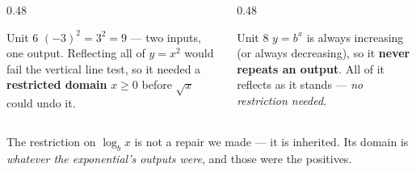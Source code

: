 \documentclass[aspectratio=169, 11pt]{beamer}
\begin{document}
\begin{frame}[t, plain]
  \begin{columns}[T]
    \begin{column}{0.48\textwidth}
      \begin{block}{Unit 6}
        $(-3)^2=3^2=9$ --- two inputs, one output. Reflecting all of $y=x^2$ would fail the vertical
        line test, so it needed a \textbf{restricted domain} $x\ge0$ before $\sqrt{x}$ could undo it.
      \end{block}
    \end{column}
    \begin{column}{0.48\textwidth}
      \begin{block}{Unit 8}
        $y=b^x$ is always increasing (or always decreasing), so it \textbf{never repeats an output}.
        All of it reflects as it stands --- \emph{no restriction needed}.
      \end{block}
    \end{column}
  \end{columns}
  \vspace{6pt}
  \begin{center}
    The restriction on $\log_b x$ is not a repair we made --- it is inherited. Its domain is
    \emph{whatever the exponential's outputs were}, and those were the positives.
  \end{center}
\end{frame}
\end{document}
